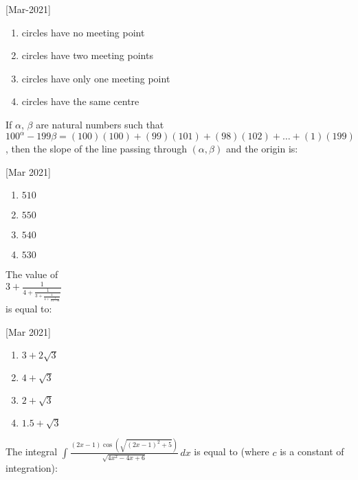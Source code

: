 	\hfill{[Mar-2021]}
	\begin{multicols}{2}
                \begin{enumerate}
    \item circles have no meeting point
    \item circles have two meeting points
    \item circles have only one meeting point
    \item circles have the same centre
                \end{enumerate}
	\end{multicols}
	\item
                If $\alpha$, $\beta$ are natural numbers such that $100^{\alpha} - 199\beta = (100)(100) + (99)(101) + (98)(102) + \ldots + (1)(199)$, then the slope of the line passing through $(\alpha ,\beta)$ and the origin is:

			\hfill{[Mar 2021]}
			\begin{multicols}{4}
                \begin{enumerate}
    \item $ 510 $
    \item $ 550 $
    \item $ 540 $
    \item $ 530 $
                \end{enumerate}
			\end{multicols}
	\item
		The value of \\
		$ 3 + \frac{1}{4 + \frac{1}{3 + \frac{1}{4 + \frac{1}{3 + \ldots \infty}}}} $  \\
		is equal to:

			\hfill{[Mar 2021]}
			\begin{multicols}{2}
		\begin{enumerate}
    \item $ 3 + 2\sqrt{3} $
    \item $ 4 + \sqrt{3} $
    \item $ 2 + \sqrt{3} $
    \item $ 1.5 + \sqrt{3} $
                \end{enumerate}
			\end{multicols}
	\item
		The integral $
\int \frac{(2x - 1) \cos\left(\sqrt{(2x - 1)^2 + 5}\right)}{\sqrt{4x^2 - 4x + 6}} \, dx $ is equal to (where \( c \) is a constant of integration):


